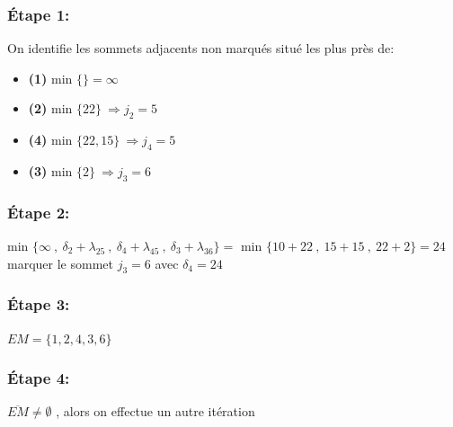 \documentclass{article}
\begin{document}
\subsubsection*{Étape 1:}
On identifie les sommets adjacents non marqués situé les plus près de:
\begin{itemize}
    \item \textbf{(1)} min $\{\}=\infty$
    \item \textbf{(2)} min $\{22\}\: \Rightarrow j_2 = 5$ \\
    \item \textbf{(4)} min $\{22,15\}\: \Rightarrow j_4 =5$ \\
    \item \textbf{(3)} min $\{2\}\: \Rightarrow j_3 =6$ \\
\end{itemize}
\subsubsection*{Étape 2:}
min $\{ \infty \:,\: \delta_2 +\lambda_{25} \:,\: \delta_4 + \lambda_{45} \:,\: \delta_3 + \lambda_{36}\} = $ min $\{10+22\:,\:15+15\:,\:22+2\}=24$ \\
marquer le sommet $j_3=6$ avec $\delta_4=24$\\ 
\subsubsection*{Étape 3:}
$EM=\{1,2,4,3,6\}$
\subsubsection*{Étape 4:}
$\overline{EM} \neq \emptyset $ , alors on effectue un autre itération
\end{document}
